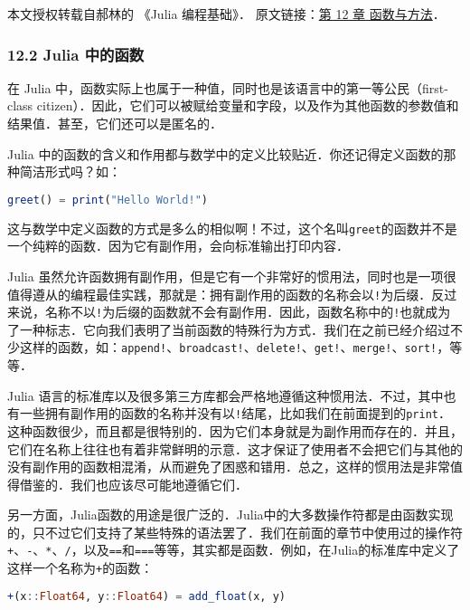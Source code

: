 
本文授权转载自郝林的 《Julia 编程基础》． 原文链接：\href{https://github.com/hyper0x/JuliaBasics/blob/master/book/ch12.md}{第 12 章 函数与方法}．

\subsubsection{12.2 Julia 中的函数}

在 Julia 中，函数实际上也属于一种值，同时也是该语言中的第一等公民（first-class citizen）．因此，它们可以被赋给变量和字段，以及作为其他函数的参数值和结果值．甚至，它们还可以是匿名的．

Julia 中的函数的含义和作用都与数学中的定义比较贴近．你还记得定义函数的那种简洁形式吗？如：

\begin{lstlisting}[language=julia]
greet() = print("Hello World!")
\end{lstlisting}

这与数学中定义函数的方式是多么的相似啊！不过，这个名叫\verb|greet|的函数并不是一个纯粹的函数．因为它有副作用，会向标准输出打印内容．

Julia 虽然允许函数拥有副作用，但是它有一个非常好的惯用法，同时也是一项很值得遵从的编程最佳实践，那就是：拥有副作用的函数的名称会以\verb|!|为后缀．反过来说，名称不以\verb|!|为后缀的函数就不会有副作用．因此，函数名称中的\verb|!|也就成为了一种标志．它向我们表明了当前函数的特殊行为方式．我们在之前已经介绍过不少这样的函数，如：\verb|append!|、\verb|broadcast!|、\verb|delete!|、\verb|get!|、\verb|merge!|、\verb|sort!|，等等．

Julia 语言的标准库以及很多第三方库都会严格地遵循这种惯用法．不过，其中也有一些拥有副作用的函数的名称并没有以\verb|!|结尾，比如我们在前面提到的\verb|print|．这种函数很少，而且都是很特别的．因为它们本身就是为副作用而存在的．并且，它们在名称上往往也有着非常鲜明的示意．这才保证了使用者不会把它们与其他的没有副作用的函数相混淆，从而避免了困惑和错用．总之，这样的惯用法是非常值得借鉴的．我们也应该尽可能地遵循它们．

另一方面，Julia函数的用途是很广泛的．Julia中的大多数操作符都是由函数实现的，只不过它们支持了某些特殊的语法罢了．我们在前面的章节中使用过的操作符\verb|+|、\verb|-|、\verb|*|、\verb|/|，以及\verb|==|和\verb|===|等等，其实都是函数．例如，在Julia的标准库中定义了这样一个名称为\verb|+|的函数：

\begin{lstlisting}[language=julia]
+(x::Float64, y::Float64) = add_float(x, y)
\end{lstlisting}

